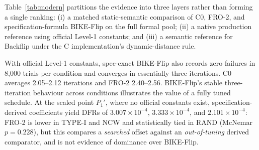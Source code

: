 \documentclass[lettersize,journal]{IEEEtran}
\begin{document}
Table~\ref{tab:modern} partitions the evidence into three layers rather than forming a single ranking: (i) a matched static-semantic comparison of C0, FRO-2, and specification-formula BIKE-Flip on the full formal pool; (ii) a native production reference using official Level-1 constants; and (iii) a semantic reference for Backflip under the C implementation's dynamic-distance rule.

\begin{table}[t]
\centering
\caption{Modern-decoder comparisons and cross-implementation validation. DFR values are observed; zero-failure cells give rule-of-three upper bounds.}
\label{tab:modern}
\footnotesize
\setlength{\tabcolsep}{4pt}
\end{table}

With official Level-1 constants, spec-exact BIKE-Flip also records zero failures in 8{,}000 trials per condition and converges in essentially three iterations. C0 averages 2.05--2.12 iterations and FRO-2 2.40--2.56. BIKE-Flip's stable three-iteration behaviour across conditions illustrates the value of a fully tuned schedule. At the scaled point $P_1'$, where no official constants exist, specification-derived coefficients yield DFRs of $3.007\times10^{-4}$, $3.333\times10^{-4}$, and $2.101\times10^{-4}$: FRO-2 is lower in TYPE-I and NCW and statistically tied in RAND (McNemar $p=0.228$), but this compares a \emph{searched} offset against an \emph{out-of-tuning} derived comparator, and is not evidence of dominance over BIKE-Flip.
\end{document}
